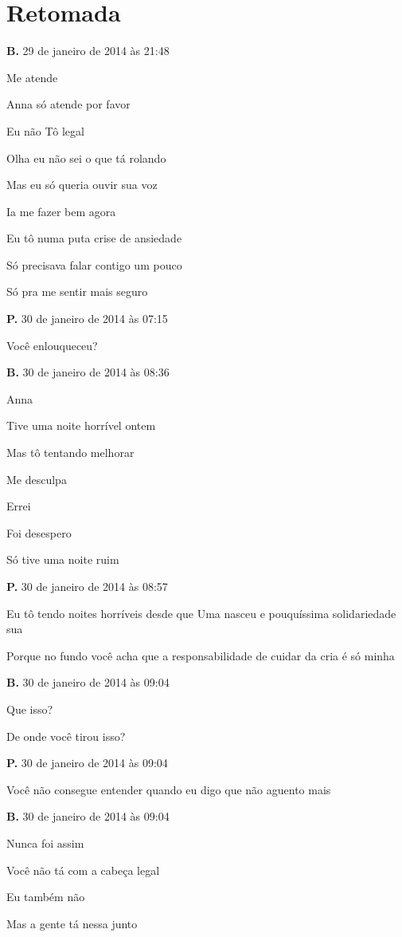 \chapter{Retomada}

{\parindent0pt\parskip1pt\raggedright
\textbf{B.} 29 de janeiro de 2014 às 21:48

Me atende

Anna só atende por favor

Eu não Tô legal

Olha eu não sei o que tá rolando

Mas eu só queria ouvir sua voz

Ia me fazer bem agora

Eu tô numa puta crise de ansiedade

Só precisava falar contigo um pouco

Só pra me sentir mais seguro

\textbf{P.} 30 de janeiro de 2014 às 07:15

Você enlouqueceu?

\textbf{B.} 30 de janeiro de 2014 às 08:36

Anna

Tive uma noite horrível ontem

Mas tô tentando melhorar

Me desculpa

Errei

Foi desespero

Só tive uma noite ruim

\textbf{P.} 30 de janeiro de 2014 às 08:57

Eu tô tendo noites horríveis desde que Uma nasceu e pouquíssima
solidariedade sua

Porque no fundo você acha que a responsabilidade de cuidar da cria é só
minha

\textbf{B.} 30 de janeiro de 2014 às 09:04

Que isso?

De onde você tirou isso?

\textbf{P.} 30 de janeiro de 2014 às 09:04

Você não consegue entender quando eu digo que não aguento mais

\textbf{B.} 30 de janeiro de 2014 às 09:04

Nunca foi assim

Você não tá com a cabeça legal

Eu também não

Mas a gente tá nessa junto

}
